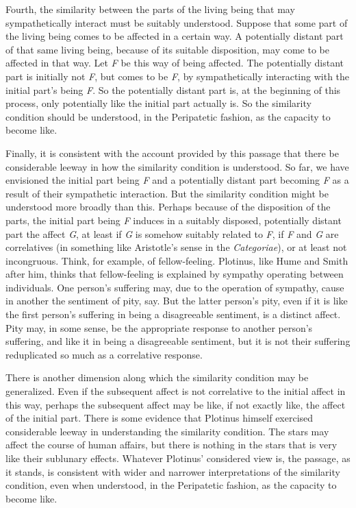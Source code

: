 Fourth, the similarity between the parts of the living being that may sympathetically interact must be suitably understood. Suppose that some part of the living being comes to be affected in a certain way. A potentially distant part of that same living being, because of its suitable disposition, may come to be affected in that way. Let \emph{F} be this way of being affected. The potentially distant part is initially not \emph{F}, but comes to be \emph{F}, by sympathetically interacting with the initial part's being \emph{F}. So the potentially distant part is, at the beginning of this process, only potentially like the initial part actually is. So the similarity condition should be understood, in the Peripatetic fashion, as the capacity to become like.

Finally, it is consistent with the account provided by this passage that there be considerable leeway in how the similarity condition is understood. So far, we have envisioned the initial part being \emph{F} and a potentially distant part becoming \emph{F} as a result of their sympathetic interaction. But the similarity condition might be understood more broadly than this. Perhaps because of the disposition of the parts, the initial part being \emph{F} induces in a suitably disposed, potentially distant part the affect \emph{G}, at least if \emph{G} is somehow suitably related to \emph{F}, if \emph{F} and \emph{G} are correlatives (in something like Aristotle's sense in the \emph{Categoriae}), or at least not incongruous. Think, for example, of fellow-feeling. Plotinus, like Hume and Smith after him, thinks that fellow-feeling is explained by sympathy operating between individuals. One person's suffering may, due to the operation of sympathy, cause in another the sentiment of pity, say. But the latter person's pity, even if it is like the first person's suffering in being a disagreeable sentiment, is a distinct affect. Pity may, in some sense, be the appropriate response to another person's suffering, and like it in being a disagreeable sentiment, but it is not their suffering reduplicated so much as a correlative response. 

There is another dimension along which the similarity condition may be generalized. Even if the subsequent affect is not correlative to the initial affect in this way, perhaps the subsequent affect may be like, if not exactly like, the affect of the initial part. There is some evidence that Plotinus himself exercised considerable leeway in understanding the similarity condition. The stars may affect the course of human affairs, but there is nothing in the stars that is very like their sublunary effects. Whatever Plotinus' considered view is, the passage, as it stands, is consistent with wider and narrower interpretations of the similarity condition, even when understood, in the Peripatetic fashion, as the capacity to become like.


